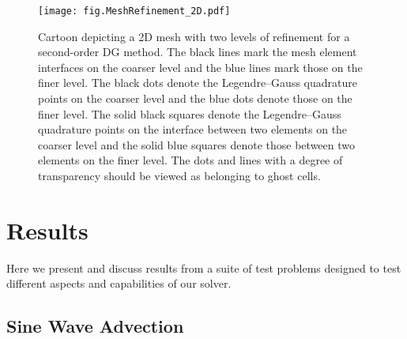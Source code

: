 \begin{figure}[htb!]
  \centering
  \texttt{[image: fig.MeshRefinement\_2D.pdf]}
  \caption{Cartoon depicting a 2D mesh with two levels of refinement
  for a second-order DG method.
  The black lines mark the mesh element interfaces on the coarser level
  and the blue lines mark those on the finer level.
  The black dots denote the Legendre--Gauss quadrature points on the coarser
  level and the blue dots denote those on the finer level.
  The solid black squares denote the Legendre--Gauss quadrature points
  on the interface between two elements on the coarser level and the solid blue
  squares denote those between two elements on the finer level.
  The dots and lines with a degree of transparency should be viewed as
  belonging to ghost cells.
  }
  \label{fig.MR2D}
\end{figure}

\section{Results}

Here we present and discuss results from a suite of test problems designed to
test different aspects and capabilities of our solver.

\subsection{Sine Wave Advection}

